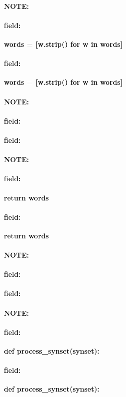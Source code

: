 \documentclass[12pt]{article}
\newenvironment{note}{\paragraph{NOTE:}}{}
\newenvironment{field}{\paragraph{field:}}{}
\begin{document}
\begin{note}
\begin{field}
\textbf{\large words = [w.strip() for w in words]}
\end{field}
\begin{field}
\textbf{\large words = [w.strip() for w in words]}
\begin{description}

\end{description}
\end{field}
\end{note}
\begin{note}
\begin{field}
\textbf{\large }
\end{field}
\begin{field}
\textbf{\large }
\begin{description}

\end{description}
\end{field}
\end{note}
\begin{note}
\begin{field}
\textbf{\large return words}
\end{field}
\begin{field}
\textbf{\large return words}
\begin{description}

\end{description}
\end{field}
\end{note}
\begin{note}
\begin{field}
\textbf{\large }
\end{field}
\begin{field}
\textbf{\large }
\begin{description}

\end{description}
\end{field}
\end{note}
\begin{note}
\begin{field}
\textbf{\large def process_synset(synset):}
\end{field}
\begin{field}
\textbf{\large def process_synset(synset):}
\begin{description}

\end{description}
\end{field}
\end{note}
\end{document}
